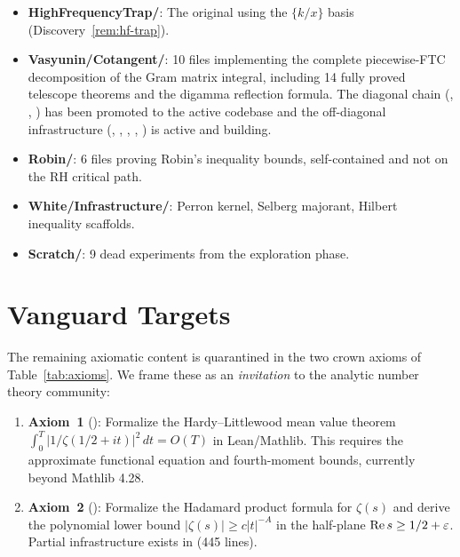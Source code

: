 \documentclass[11pt,a4paper]{article}
\begin{document}
\begin{itemize}
  \item \textbf{HighFrequencyTrap/}: The original 
    using the $\{k/x\}$ basis (Discovery~\ref{rem:hf-trap}).
  \item \textbf{Vasyunin/Cotangent/}: 10 files implementing the complete
    piecewise-FTC decomposition of the Gram matrix integral, including
    14 fully proved telescope theorems and the digamma reflection formula.
    The diagonal chain (, ,
    ) has been promoted to the active codebase
    and the off-diagonal infrastructure (,
    , , ,
    ) is active and building.
  \item \textbf{Robin/}: 6 files proving Robin's inequality bounds,
    self-contained and not on the RH critical path.
  \item \textbf{White/Infrastructure/}: Perron kernel, Selberg majorant,
    Hilbert inequality scaffolds.
  \item \textbf{Scratch/}: 9 dead experiments from the exploration phase.
\end{itemize}

\section{Vanguard Targets}
\label{sec:vanguard}

The remaining axiomatic content is quarantined in the two crown axioms of
Table~\ref{tab:axioms}. We frame these as an \emph{invitation}
to the analytic number theory community:

\begin{enumerate}
  \item \textbf{Axiom~1} ():
    Formalize the Hardy--Littlewood mean value theorem
    $\int_0^T |1/\zeta(1/2+it)|^2\,dt = O(T)$ in Lean/Mathlib.
    This requires the approximate functional equation and fourth-moment
    bounds, currently beyond Mathlib 4.28.
  \item \textbf{Axiom~2} ():
    Formalize the Hadamard product formula for $\zeta(s)$ and derive
    the polynomial lower bound $|\zeta(s)| \ge c|t|^{-A}$ in the
    half-plane $\operatorname{Re} s \ge 1/2 + \varepsilon$. Partial infrastructure
    exists in  (445 lines).
\end{enumerate}
\end{document}
